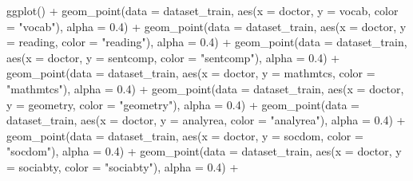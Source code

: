 \documentclass[
]{article}
\newenvironment{Shaded}{\begin{snugshade}}{\end{snugshade}}
\newcommand{\AttributeTok}[1]{\textcolor[rgb]{0.77,0.63,0.00}{#1}}
\newcommand{\FloatTok}[1]{\textcolor[rgb]{0.00,0.00,0.81}{#1}}
\newcommand{\FunctionTok}[1]{\textcolor[rgb]{0.00,0.00,0.00}{#1}}
\newcommand{\NormalTok}[1]{#1}
\newcommand{\SpecialCharTok}[1]{\textcolor[rgb]{0.00,0.00,0.00}{#1}}
\newcommand{\StringTok}[1]{\textcolor[rgb]{0.31,0.60,0.02}{#1}}
\begin{document}
\begin{Shaded}
\begin{Highlighting}[]
\FunctionTok{ggplot}\NormalTok{() }\SpecialCharTok{+} \FunctionTok{geom\_point}\NormalTok{(}\AttributeTok{data =}\NormalTok{ dataset\_train, }\FunctionTok{aes}\NormalTok{(}\AttributeTok{x =}\NormalTok{ doctor, }\AttributeTok{y =}\NormalTok{ vocab,}
    \AttributeTok{color =} \StringTok{"vocab"}\NormalTok{), }\AttributeTok{alpha =} \FloatTok{0.4}\NormalTok{) }\SpecialCharTok{+} \FunctionTok{geom\_point}\NormalTok{(}\AttributeTok{data =}\NormalTok{ dataset\_train,}
    \FunctionTok{aes}\NormalTok{(}\AttributeTok{x =}\NormalTok{ doctor, }\AttributeTok{y =}\NormalTok{ reading, }\AttributeTok{color =} \StringTok{"reading"}\NormalTok{), }\AttributeTok{alpha =} \FloatTok{0.4}\NormalTok{) }\SpecialCharTok{+}
    \FunctionTok{geom\_point}\NormalTok{(}\AttributeTok{data =}\NormalTok{ dataset\_train, }\FunctionTok{aes}\NormalTok{(}\AttributeTok{x =}\NormalTok{ doctor, }\AttributeTok{y =}\NormalTok{ sentcomp,}
        \AttributeTok{color =} \StringTok{"sentcomp"}\NormalTok{), }\AttributeTok{alpha =} \FloatTok{0.4}\NormalTok{) }\SpecialCharTok{+} \FunctionTok{geom\_point}\NormalTok{(}\AttributeTok{data =}\NormalTok{ dataset\_train,}
    \FunctionTok{aes}\NormalTok{(}\AttributeTok{x =}\NormalTok{ doctor, }\AttributeTok{y =}\NormalTok{ mathmtcs, }\AttributeTok{color =} \StringTok{"mathmtcs"}\NormalTok{), }\AttributeTok{alpha =} \FloatTok{0.4}\NormalTok{) }\SpecialCharTok{+}
    \FunctionTok{geom\_point}\NormalTok{(}\AttributeTok{data =}\NormalTok{ dataset\_train, }\FunctionTok{aes}\NormalTok{(}\AttributeTok{x =}\NormalTok{ doctor, }\AttributeTok{y =}\NormalTok{ geometry,}
        \AttributeTok{color =} \StringTok{"geometry"}\NormalTok{), }\AttributeTok{alpha =} \FloatTok{0.4}\NormalTok{) }\SpecialCharTok{+} \FunctionTok{geom\_point}\NormalTok{(}\AttributeTok{data =}\NormalTok{ dataset\_train,}
    \FunctionTok{aes}\NormalTok{(}\AttributeTok{x =}\NormalTok{ doctor, }\AttributeTok{y =}\NormalTok{ analyrea, }\AttributeTok{color =} \StringTok{"analyrea"}\NormalTok{), }\AttributeTok{alpha =} \FloatTok{0.4}\NormalTok{) }\SpecialCharTok{+}
    \FunctionTok{geom\_point}\NormalTok{(}\AttributeTok{data =}\NormalTok{ dataset\_train, }\FunctionTok{aes}\NormalTok{(}\AttributeTok{x =}\NormalTok{ doctor, }\AttributeTok{y =}\NormalTok{ socdom,}
        \AttributeTok{color =} \StringTok{"socdom"}\NormalTok{), }\AttributeTok{alpha =} \FloatTok{0.4}\NormalTok{) }\SpecialCharTok{+} \FunctionTok{geom\_point}\NormalTok{(}\AttributeTok{data =}\NormalTok{ dataset\_train,}
    \FunctionTok{aes}\NormalTok{(}\AttributeTok{x =}\NormalTok{ doctor, }\AttributeTok{y =}\NormalTok{ sociabty, }\AttributeTok{color =} \StringTok{"sociabty"}\NormalTok{), }\AttributeTok{alpha =} \FloatTok{0.4}\NormalTok{) }\SpecialCharTok{+}

\end{Highlighting}
\end{Shaded}
\end{document}
